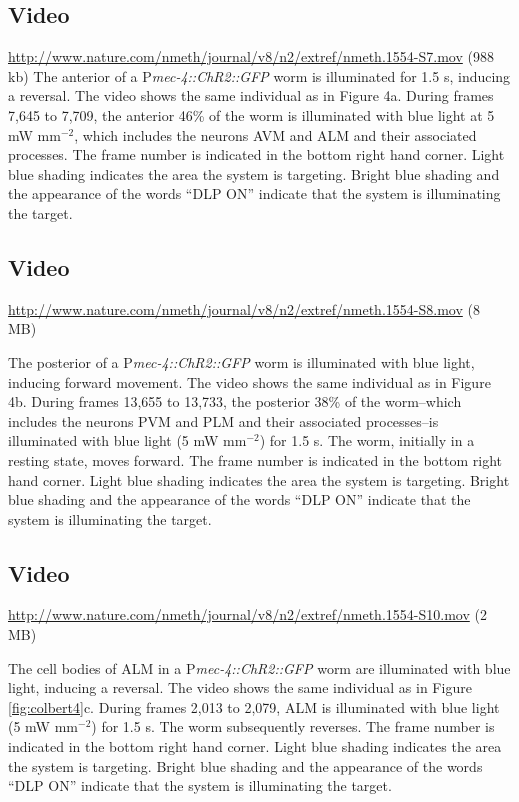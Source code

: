 \subsection{Video}\label{movie:colbert6} %

\url{http://www.nature.com/nmeth/journal/v8/n2/extref/nmeth.1554-S7.mov} (988 kb)
The anterior of a P\textit{mec-4::ChR2::GFP} worm is illuminated for 1.5 s, inducing a reversal. The video shows the same individual as in Figure 4a. During frames 7,645 to 7,709, the anterior 46\% of the worm is illuminated with blue light at 5 mW mm$^{−2}$, which includes the neurons AVM and ALM and their associated processes. The frame number is indicated in the bottom right hand corner. Light blue shading indicates the area the system is targeting. Bright blue shading and the appearance of the words “DLP ON” indicate that the system is illuminating the target.

\subsection{Video}\label{movie:colbert7} %
\url{http://www.nature.com/nmeth/journal/v8/n2/extref/nmeth.1554-S8.mov} (8 MB)

The posterior of a P\textit{mec-4::ChR2::GFP} worm is illuminated with blue light, inducing forward movement. The video shows the same individual as in Figure 4b. During frames 13,655 to 13,733, the posterior 38\% of the worm--which includes the neurons PVM and PLM and their associated processes--is illuminated with blue light (5 mW mm$^{−2}$) for 1.5 s. The worm, initially in a resting state, moves forward. The frame number is indicated in the bottom right hand corner. Light blue shading indicates the area the system is targeting. Bright blue shading and the appearance of the words “DLP ON” indicate that the system is illuminating the target.

\subsection{Video}\label{movie:colbert8} %
\url{http://www.nature.com/nmeth/journal/v8/n2/extref/nmeth.1554-S10.mov} (2 MB)

The cell bodies of ALM in a P\textit{mec-4::ChR2::GFP} worm are illuminated with blue light, inducing a reversal. The video shows the same individual as in Figure \ref{fig:colbert4}c. During frames 2,013 to 2,079, ALM is illuminated with blue light (5 mW mm$^{−2}$) for 1.5 s. The worm subsequently reverses. The frame number is indicated in the bottom right hand corner. Light blue shading indicates the area the system is targeting. Bright blue shading and the appearance of the words “DLP ON” indicate that the system is illuminating the target.

